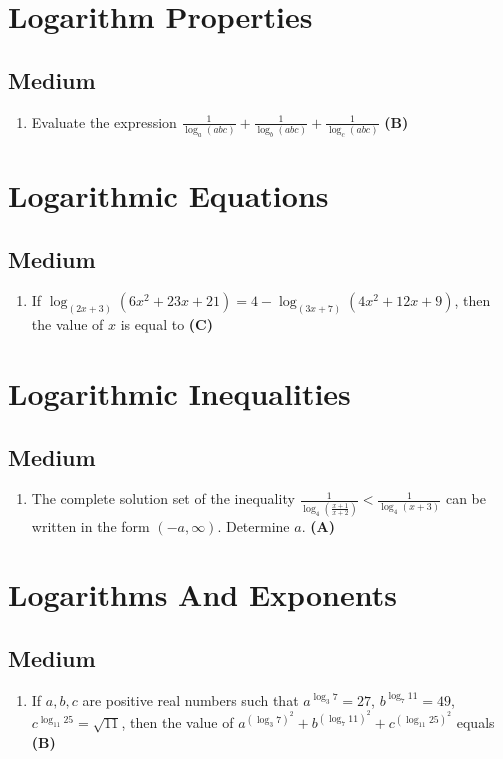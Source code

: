 \documentclass{article}
\begin{document}
\section{Logarithm Properties}
\subsection{Medium}
\begin{enumerate}
\item Evaluate the expression $\frac{1}{\log_a(abc)} + \frac{1}{\log_b(abc)} + \frac{1}{\log_c(abc)}$ \hfill \textbf{(B)}
\end{enumerate}
\section{Logarithmic Equations}
\subsection{Medium}
\begin{enumerate}
\item If $\log_{(2x+3)} (6x^2 + 23x +21) = 4 - \log_{(3x+7)} (4x^2 + 12x + 9)$, then the value of $x$ is equal to \hfill \textbf{(C)}
\end{enumerate}
\section{Logarithmic Inequalities}
\subsection{Medium}
\begin{enumerate}
\item The complete solution set of the inequality $\frac{1}{\log_4(\frac{x+1}{x+2})} < \frac{1}{\log_4(x + 3)}$ can be written in the form $(-a, \infty)$. Determine $a$. \hfill \textbf{(A)}
\end{enumerate}
\section{Logarithms And Exponents}
\subsection{Medium}
\begin{enumerate}
\item If $a, b, c$ are positive real numbers such that $a^{\log_3 7} = 27$, $b^{\log_7 11} = 49$, $c^{\log_{11} 25} = \sqrt{11}$, then the value of $a^{(\log_3 7)^2} + b^{(\log_7 11)^2} + c^{(\log_{11} 25)^2}$ equals \hfill \textbf{(B)}
\end{enumerate}
\end{document}
